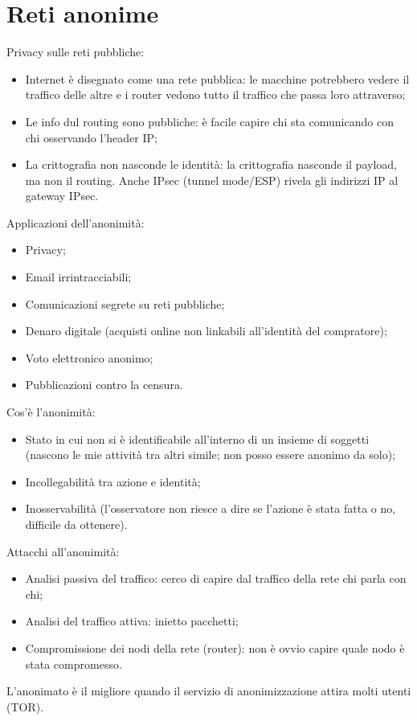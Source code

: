 \setchapterpreamble[u]{\margintoc}
\chapter{Reti anonime}

Privacy sulle reti pubbliche:
\begin{itemize}
    \item Internet è disegnato come una rete pubblica: le macchine potrebbero vedere il traffico delle altre e i router vedono tutto il traffico che passa loro attraverso;
	\item Le info dul routing sono pubbliche: è facile capire chi sta comunicando con chi osservando l'header IP;
	\item La crittografia non nasconde le identità: la crittografia nasconde il payload, ma non il routing. Anche IPsec (tunnel mode/ESP) rivela gli indirizzi IP al gateway IPsec.
\end{itemize}

Applicazioni dell'anonimità:
\begin{itemize}
    \item Privacy;
	\item Email irrintracciabili;
	\item  Comunicazioni segrete su reti pubbliche;
	\item Denaro digitale (acquisti online non linkabili all'identità del compratore);
	\item Voto elettronico anonimo;
	\item Pubblicazioni contro la censura.
\end{itemize}
	
Cos'è l'anonimità:
\begin{itemize}
    \item Stato in cui non si è identificabile all'interno di un insieme di soggetti (nascono le mie attività tra altri simile; non posso essere anonimo da solo);
	\item Incollegabilità tra azione e identità;
	\item Inosservabilità (l'osservatore non riesce a dire se l'azione è stata fatta o no, difficile da ottenere).
\end{itemize}

Attacchi all'anonimità:
\begin{itemize}
    \item Analisi passiva del traffico: cerco di capire dal traffico della rete chi parla con chi;
	\item Analisi del traffico attiva: inietto pacchetti;
	\item Compromissione dei nodi della rete (router): non è ovvio capire quale nodo è stata compromesso.
\end{itemize}

L'anonimato è il migliore quando il servizio di anonimizzazione attira molti utenti (TOR).